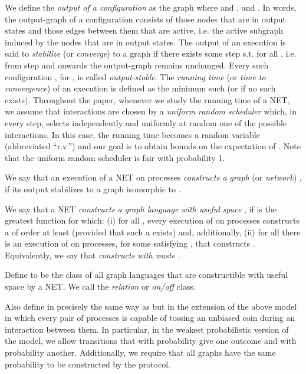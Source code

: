\documentclass[oribibl, 11pt]{llncs}
\begin{document}
We define the \emph{output of a configuration}  as the graph  where  and  , and . In words, the output-graph of a configuration consists of those nodes that are in output states and those edges between them that are active, i.e. the active subgraph induced by the nodes that are in output states. The output of an execution  is said to \emph{stabilize} (or \emph{converge}) to a graph  if there exists some step  s.t.  for all , i.e. from step  and onwards the output-graph remains unchanged. Every such configuration , for , is called \emph{output-stable}. The \emph{running time} (or \emph{time to convergence}) of an execution is defined as the minimum such  (or  if no such  exists). Throughout the paper, whenever we study the running time of a NET, we assume that interactions are chosen by a \emph{uniform random scheduler} which, in every step, selects independently and uniformly at random one of the  possible interactions. In this case, the running time becomes a random variable (abbreviated ``r.v.'')  and our goal is to obtain bounds on the expectation  of . Note that the uniform random scheduler is fair with probability 1.

\begin{definition}
We say that an execution of a NET on  processes \emph{constructs a graph} (or \emph{network}) , if its output stabilizes to a graph isomorphic to .
\end{definition}

\begin{definition}
We say that a NET  \emph{constructs a graph language  with useful space }, if  is the greatest function for which: (i) for all , every execution of  on  processes constructs a  of order at least  (provided that such a  exists) and, additionally, (ii) for all  there is an execution of  on  processes, for some  satisfying , that constructs . Equivalently, we say that \emph{ constructs  with waste }.
\end{definition}

\begin{definition}
Define  to be the class of all graph languages that are constructible with useful space  by a NET. We call  the \emph{relation} or \emph{on/off} class. 
\end{definition}

Also define  in precisely the same way as  but in the extension of the above model in which every pair of processes is capable of tossing an unbiased coin during an interaction between them. In particular, in the weakest probabilistic version of the model, we allow transitions that with probability  give one outcome and with probability  another. Additionally, we require that all graphs have the same probability to be constructed by the protocol.
\end{document}
